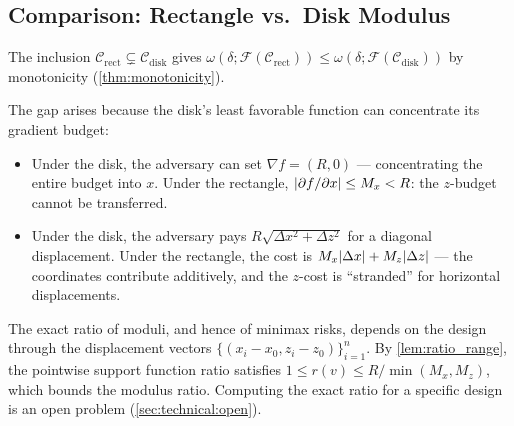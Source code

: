 

\subsection{Comparison: Rectangle vs.\ Disk Modulus}\label{app:modulus:comparison}

The inclusion $\mathcal{C}_{\mathrm{rect}} \subsetneq \mathcal{C}_{\mathrm{disk}}$ gives $\omega(\delta; \mathcal{F}(\mathcal{C}_{\mathrm{rect}})) \leq \omega(\delta; \mathcal{F}(\mathcal{C}_{\mathrm{disk}}))$ by monotonicity (\cref{thm:monotonicity}).

The gap arises because the disk's least favorable function can concentrate its gradient budget:
\begin{itemize}
	\item Under the disk, the adversary can set $\nabla f = (R, 0)$ --- concentrating the entire budget into $x$.
	Under the rectangle, $\lvert\partial f / \partial x\rvert \leq M_x < R$: the $z$-budget cannot be transferred.
	\item Under the disk, the adversary pays $R\sqrt{\Delta x^2 + \Delta z^2}$ for a diagonal displacement.
	Under the rectangle, the cost is $M_x\lvert\Delta x\rvert + M_z\lvert\Delta z\rvert$ --- the coordinates contribute additively, and the $z$-cost is ``stranded'' for horizontal displacements.
\end{itemize}

The exact ratio of moduli, and hence of minimax risks, depends on the design through the displacement vectors $\{(x_i - x_0, z_i - z_0)\}_{i=1}^n$.
By \cref{lem:ratio_range}, the pointwise support function ratio satisfies $1 \leq r(v) \leq R / \min(M_x, M_z)$, which bounds the modulus ratio.
Computing the exact ratio for a specific design is an open problem (\cref{sec:technical:open}).


